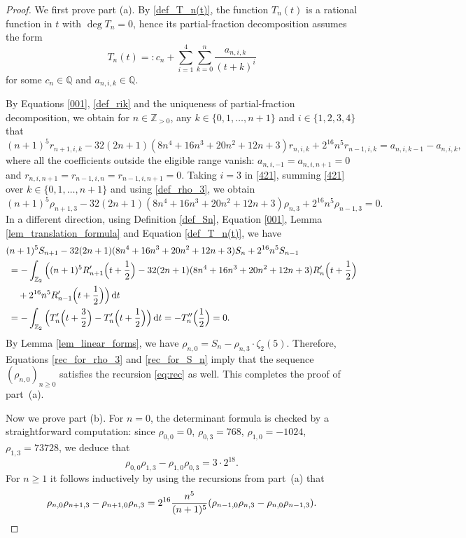\documentclass[12pt]{article}
\let\ge\geqslant
\renewcommand{\d}{\mathrm{d}}
\theoremstyle{remark}
\numberwithin{equation}{section}
\begin{document}
\begin{proof}
We first prove part (a). 
By \eqref{def_T_n(t)}, the function $T_n(t)$ is a rational function in $t$ with $\deg T_n = 0$, hence its partial-fraction decomposition assumes the form
\[
T_n(t) =: c_{n} + \sum_{i=1}^{4}\sum_{k=0}^n \frac{a_{n,i,k}}{(t+k)^i}
\]
for some $c_n \in \mathbb{Q}$ and $a_{n,i,k} \in \mathbb{Q}$.

By Equations \eqref{001}, \eqref{def_rik} and the uniqueness of partial-fraction decomposition, we obtain for $n \in \mathbb{Z}_{>0}$, any $k \in \{0,1,\dots,n+1\}$ and $i \in\{1,2,3,4\}$ that
\begin{equation}
(n+1)^5 r_{n+1,i,k} - 32(2n+1)(8n^4+16n^3+20n^2+12n+3) r_{n,i,k} + 2^{16}n^5 r_{n-1,i,k} = a_{n,i,k-1} - a_{n,i,k},
\label{421}
\end{equation}
where all the coefficients outside the eligible range vanish:
$a_{n,i,-1} = a_{n,i,n+1} =0$ and $r_{n,i,n+1} =r_{n-1,i,n} =r_{n-1,i,n+1} = 0$.
Taking $i=3$ in \eqref{421}, summing \eqref{421} over $k \in \{0,1,\dots,n+1\}$ and using \eqref{def_rho_3}, we obtain
\begin{equation}
\label{rec_for_rho_3}
(n+1)^5\rho_{n+1,3} - 32(2n+1)(8n^4+16n^3+20n^2+12n+3)\rho_{n,3} + 2^{16}n^5\rho_{n-1,3} = 0.
\end{equation}
In a different direction, using Definition \ref{def_Sn}, Equation \eqref{001}, Lemma \ref{lem_translation_formula} and Equation \eqref{def_T_n(t)}, we have
\begin{align}
&
(n+1)^5 S_{n+1} - 32(2n+1)(8n^4+16n^3+20n^2+12n+3) S_n + 2^{16}n^5 S_{n-1}
\notag\\
&\; =-\int_{\mathbb{Z}_2} \Big( (n+1)^5 R_{n+1}'\Big(t +\frac{1}{2} \Big) - 32(2n+1)(8n^4+16n^3+20n^2+12n+3) R_n'\Big(t +\frac{1}{2} \Big)
\notag\\ &\;\quad
+ 2^{16}n^5 R_{n-1}'\Big(t +\frac{1}{2} \Big)  \Big) \,\d t \notag\\
&\; = -\int_{\mathbb{Z}_2} \Big( T_n'\Big(t +\frac{3}{2} \Big) - T_n'\Big(t +\frac{1}{2} \Big) \Big) \,\d t
= -T_n''\Big( \frac{1}{2} \Big) 
= 0.
\label{rec_for_S_n}
\end{align}
By Lemma \ref{lem_linear_forms}, we have $\rho_{n,0} = S_n - \rho_{n,3}\cdot\zeta_2(5)$. 
Therefore, Equations \eqref{rec_for_rho_3} and \eqref{rec_for_S_n} imply that the sequence $(\rho_{n,0})_{n \ge 0}$ satisfies the recursion \eqref{eq:rec} as well.
This completes the proof of part~(a).

Now we prove part (b). 
For $n=0$, the determinant formula is checked by a straightforward computation: since $\rho_{0,0}=0$, $\rho_{0,3}=768$, $\rho_{1,0}=-1024$, $\rho_{1,3}=73728$, we deduce that
\[
\rho_{0,0}\rho_{1,3} - \rho_{1,0}\rho_{0,3} = 3 \cdot 2^{18}.
\]
For $n\ge 1$ it follows inductively by using the recursions from part~(a) that
\[
\rho_{n,0}\rho_{n+1,3} - \rho_{n+1,0}\rho_{n,3}
=2^{16} \frac{n^5}{(n+1)^5}(\rho_{n-1,0}\rho_{n,3} - \rho_{n,0}\rho_{n-1,3}).
\qedhere
\]
\end{proof}
\end{document}
